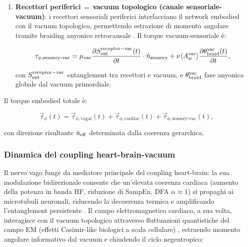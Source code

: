 \documentclass[11pt,a4paper]{article}
\let\oldcite\cite
\renewcommand{\cite}{\protect\oldcite}
\let\oldref\ref
\renewcommand{\ref}{\protect\oldref}
\theoremstyle{plain}
\theoremstyle{definition}
\begin{document}
\begin{enumerate}
    dove $W_{\rm proxy}^{\rm HRV}$ è il proxy entanglement witness (Eq.~\ref{eq:proxy_ent_witness}), e $\theta_{\rm EM}$ è la fase del campo cardiaco.


    \vspace{0.3cm}

    \item \textbf{Recettori periferici ↔ vacuum topologico (canale sensoriale-vacuum)}: i recettori sensoriali periferici interfacciano il network embodied con il vacuum topologico, permettendo estrazione di momento angolare tramite braiding anyonico retrocausale \cite{heartmath2025coherence}. Il torque vacuum-sensoriale è:

    \begin{equation}
    \tau_{\phi,\text{sensory-vac}} = \mu_{\text{vac}} \frac{\partial S_{\rm ent}^{\rm receptor-vac}(t)}{\partial t} \cdot \hat{n}_{\text{sensory}} + \nu \langle A_w^{\rm vac} \rangle \frac{\partial \theta_{\rm braid}^{\rm vac}(t)}{\partial t},
    \label{eq:torque_sensory_vac}
    \end{equation}

    con $S_{\rm ent}^{\rm receptor-vac}$ entanglement tra recettori e vacuum, e $\theta_{\rm braid}^{\rm vac}$ fase anyonica globale dal vacuum primordiale.
\end{enumerate}

Il torque embodied totale è:

\begin{equation}
\vec{\tau}_\phi(t) = \vec{\tau}_{\phi,\text{vagal}}(t) + \vec{\tau}_{\phi,\text{cardiac}}(t) + \vec{\tau}_{\phi,\text{sensory-vac}}(t),
\label{eq:torque_embodied_total}
\end{equation}

con direzione risultante $\hat{n}_{\rm eff}$ determinata dalla coerenza gerarchica.


\vspace{0.3cm}



\subsubsection{Dinamica del coupling heart-brain-vacuum}

Il nervo vago funge da mediatore principale del coupling heart-brain: la sua modulazione bidirezionale consente che un'elevata coerenza cardiaca (aumento della potenza in banda HF, riduzione di SampEn, DFA $\alpha \approx 1$) si propaghi ai microtubuli neuronali, riducendo la decoerenza termica e amplificando l'entanglement persistente \cite{mccraty2015coherent, brown2023vagal, thrall2024heartbrain}. Il campo elettromagnetico cardiaco, a sua volta, interagisce con il vacuum topologico attraverso fluttuazioni quantistiche del campo EM (effetti Casimir-like biologici a scala cellulare) \cite{ford2012casimir, delgiudice2014electromagnetic}, estraendo momento angolare informativo dal vacuum e chiudendo il ciclo negentropico:
\end{document}
